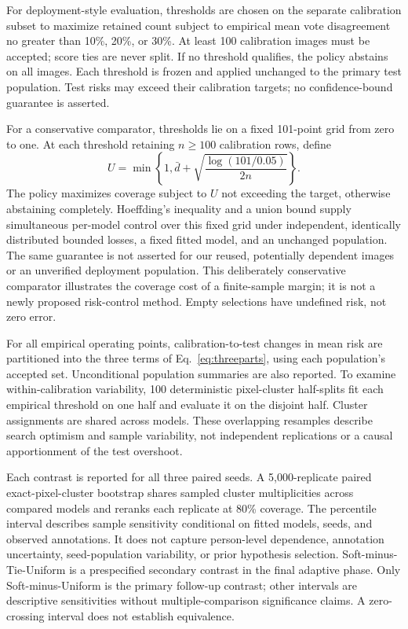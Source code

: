 \documentclass[pdflatex,sn-mathphys-num]{sn-jnl}
\begin{document}
For deployment-style evaluation, thresholds are chosen on the separate calibration subset to maximize retained count subject to empirical mean vote disagreement no greater than 10\%, 20\%, or 30\%. At least 100 calibration images must be accepted; score ties are never split. If no threshold qualifies, the policy abstains on all images. Each threshold is frozen and applied unchanged to the primary test population. Test risks may exceed their calibration targets; no confidence-bound guarantee is asserted.

For a conservative comparator, thresholds lie on a fixed 101-point grid from zero to one. At each threshold retaining $n\geq100$ calibration rows, define
\begin{equation}
U=\min\!\left\{1,\bar d+\sqrt{\frac{\log(101/0.05)}{2n}}\right\}.
\end{equation}
The policy maximizes coverage subject to $U$ not exceeding the target, otherwise abstaining completely. Hoeffding's inequality \cite{hoeffding1963} and a union bound supply simultaneous per-model control over this fixed grid under independent, identically distributed bounded losses, a fixed fitted model, and an unchanged population. The same guarantee is not asserted for our reused, potentially dependent images or an unverified deployment population. This deliberately conservative comparator illustrates the coverage cost of a finite-sample margin; it is not a newly proposed risk-control method. Empty selections have undefined risk, not zero error.

For all empirical operating points, calibration-to-test changes in mean risk are partitioned into the three terms of Eq.~\ref{eq:threeparts}, using each population's accepted set. Unconditional population summaries are also reported. To examine within-calibration variability, 100 deterministic pixel-cluster half-splits fit each empirical threshold on one half and evaluate it on the disjoint half. Cluster assignments are shared across models. These overlapping resamples describe search optimism and sample variability, not independent replications or a causal apportionment of the test overshoot.

Each contrast is reported for all three paired seeds. A 5,000-replicate paired exact-pixel-cluster bootstrap shares sampled cluster multiplicities across compared models and reranks each replicate at 80\% coverage. The percentile interval describes sample sensitivity conditional on fitted models, seeds, and observed annotations. It does not capture person-level dependence, annotation uncertainty, seed-population variability, or prior hypothesis selection. Soft-minus-Tie-Uniform is a prespecified secondary contrast in the final adaptive phase. Only Soft-minus-Uniform is the primary follow-up contrast; other intervals are descriptive sensitivities without multiple-comparison significance claims. A zero-crossing interval does not establish equivalence.
\end{document}
